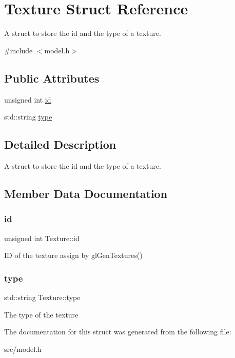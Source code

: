 \hypertarget{struct_texture}{}\section{Texture Struct Reference}
\label{struct_texture}


A struct to store the id and the type of a texture.  




{\ttfamily \#include $<$model.\+h$>$}

\subsection*{Public Attributes}
\begin{DoxyCompactItemize}
\item 
unsigned int \mbox{\hyperlink{struct_texture_aed42161a5c00b6020c85833401da6da6}{id}}
\item 
std\+::string \mbox{\hyperlink{struct_texture_a916a835d009806f2a57546c7705942b1}{type}}
\end{DoxyCompactItemize}


\subsection{Detailed Description}
A struct to store the id and the type of a texture. 

\subsection{Member Data Documentation}
\mbox{\label{struct_texture_aed42161a5c00b6020c85833401da6da6}} 
\subsubsection{\texorpdfstring{id}{id}}
{\footnotesize\ttfamily unsigned int Texture\+::id}

ID of the texture assign by gl\+Gen\+Textures() \mbox{\label{struct_texture_a916a835d009806f2a57546c7705942b1}} 
\subsubsection{\texorpdfstring{type}{type}}
{\footnotesize\ttfamily std\+::string Texture\+::type}

The type of the texture 

The documentation for this struct was generated from the following file\+:\begin{DoxyCompactItemize}
\item 
src/model.\+h\end{DoxyCompactItemize}
